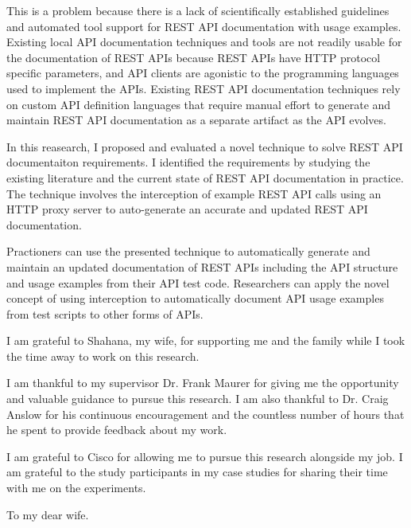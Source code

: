 \documentclass[12pt]{ucalgthes1}
\begin{document}
This is a problem because there is a lack of scientifically established guidelines and automated tool support for REST API documentation with usage examples. Existing local API documentation techniques and tools are not readily usable for the documentation of REST APIs because REST APIs have HTTP protocol specific parameters, and API clients are agonistic to the programming languages used to implement the APIs. Existing REST API documentation techniques rely on custom API definition languages that require manual effort to generate and maintain REST API documentation as a separate artifact as the API evolves.

In this reasearch, I proposed and evaluated a novel technique to solve REST API documentaiton requirements. I identified the requirements by studying the existing literature and the current state of REST API documentation in practice. The technique involves the interception of example REST API calls using an HTTP proxy server to auto-generate an accurate and updated REST API documentation.

Practioners can use the presented technique to automatically generate and maintain an updated documentation of REST APIs including the API structure and usage examples from their API test code. Researchers can apply the novel concept of using interception to automatically document API usage examples from test scripts to other forms of APIs.

\newpage
{}
{}
\begin{singlespace}
I am grateful to Shahana, my wife, for supporting me and the family while I took the time away to work on this research.

I am thankful to my supervisor Dr. Frank Maurer for giving me the opportunity and valuable guidance to pursue this research. I am also thankful to Dr. Craig Anslow for his continuous encouragement and the countless number of hours that he spent to provide feedback about my work.

I am grateful to Cisco for allowing me to pursue this research alongside my job. I am grateful to the study participants in my case studies for sharing their time with me on the experiments.
\newpage
{}
{}
\begin{center}
  To my dear wife.
\end{center}
\newpage
{}
\tableofcontents
\pagestyle{plain}
\newpage
{}
\listoftables
\pagestyle{plain}
\newpage
{}
\listoffigures
\pagestyle{plain}
\clearpage
\clearpage          %
\end{singlespace}
\newpage
{}
\end{document}
